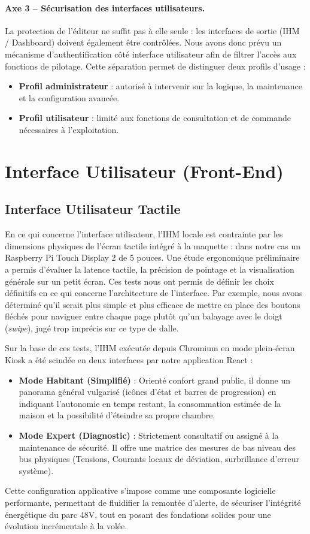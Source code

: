         \paragraph{Axe 3 -- Sécurisation des interfaces utilisateurs.}
        La protection de l'éditeur ne suffit pas à elle seule : les interfaces de sortie (IHM / Dashboard) doivent également être contrôlées. Nous avons donc prévu un mécanisme d'authentification côté interface utilisateur afin de filtrer l'accès aux fonctions de pilotage. Cette séparation permet de distinguer deux profils d'usage :
        \begin{itemize}
            \item \textbf{Profil administrateur} : autorisé à intervenir sur la logique, la maintenance et la configuration avancée.
            \item \textbf{Profil utilisateur} : limité aux fonctions de consultation et de commande nécessaires à l'exploitation.
        \end{itemize}

\section{Interface Utilisateur (Front-End)}
    
    \subsection{Interface Utilisateur Tactile}
        En ce qui concerne l'interface utilisateur, l'IHM locale est contrainte par les dimensions physiques de l'écran tactile intégré à la maquette : dans notre cas un Raspberry Pi Touch Display 2 de 5 pouces. Une étude ergonomique préliminaire a permis d'évaluer la latence tactile, la précision de pointage et la visualisation générale sur un petit écran. Ces tests nous ont permis de définir les choix définitifs en ce qui concerne l'architecture de l'interface. Par exemple, nous avons déterminé qu'il serait plus simple et plus efficace de mettre en place des boutons fléchés pour naviguer entre chaque page plutôt qu'un balayage avec le doigt (\textit{swipe}), jugé trop imprécis sur ce type de dalle. 
        
        Sur la base de ces tests, l'IHM exécutée depuis Chromium en mode plein-écran Kiosk a été scindée en deux interfaces par notre application React :
        \begin{itemize}
            \item \textbf{Mode Habitant (Simplifié)} : Orienté confort grand public, il donne un panorama général vulgarisé (icônes d'état et barres de progression) en indiquant l'autonomie en temps restant, la consommation estimée de la maison et la possibilité d'éteindre sa propre chambre.
            \item \textbf{Mode Expert (Diagnostic)} : Strictement consultatif ou assigné à la maintenance de sécurité. Il offre une matrice des mesures de bas niveau des bus physiques (Tensions, Courants locaux de déviation, surbrillance d'erreur système).
        \end{itemize}
        
    Cette configuration applicative s'impose comme une composante logicielle performante, permettant de fluidifier la remontée d'alerte, de sécuriser l'intégrité énergétique du parc 48V, tout en posant des fondations solides pour une évolution incrémentale à la volée.
